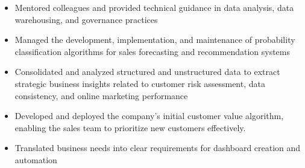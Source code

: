 \documentclass[10pt,a4paper,ragged2e,withhyper]{altacv}
\begin{document}
\begin{paracol}{2}
\begin{itemize}
\item Mentored colleagues and provided technical guidance in data analysis, data warehousing, and governance practices



\end{itemize}

\divider

\begin{itemize}

\item Managed the development, implementation, and maintenance of probability classification algorithms for sales forecasting and recommendation systems

\item Consolidated and analyzed structured and unstructured data to extract strategic business insights related to customer risk assessment, data consistency, and online marketing performance

\item Developed and deployed the company's initial customer value algorithm, enabling the sales team to prioritize new customers effectively.

\item Translated business needs into clear requirements for dashboard creation and automation  

\end{itemize}

\newpage


%



\switchcolumn







\end{paracol}
\end{document}
